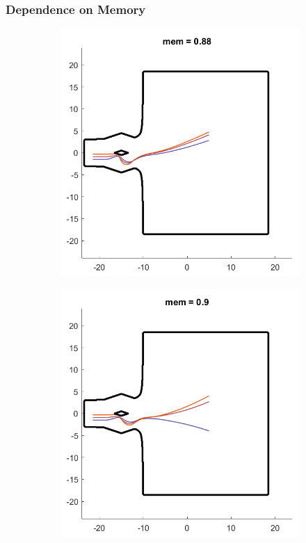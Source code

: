 \documentclass[compress,10pt,usenames,dvipsnames]{beamer}
\theoremstyle{remark}
\begin{document}
\begin{frame}\frametitle{Dependence on Memory}
	\begin{figure}
		\begin{subfigure}[t]{.33\textwidth}
			\centering
			\includegraphics[scale=0.25]{Figures/mem1.png}
			
		\end{subfigure}%
		\begin{subfigure}[t]{.33\textwidth}
			\centering
			\includegraphics[scale=0.25]{Figures/mem2.png}
			

\end{subfigure}
\end{figure}
\end{frame}
\end{document}
